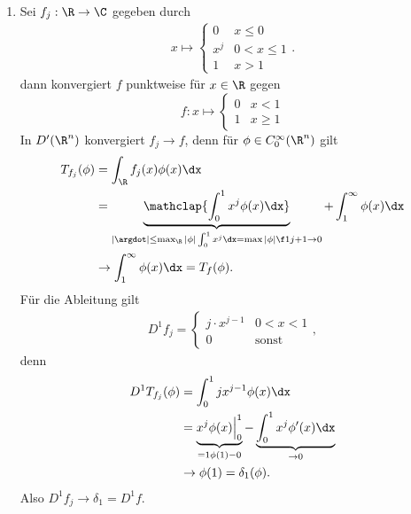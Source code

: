 \begin{ex} \label{5.17}
	\begin{enumerate}[1)]
		\item
			Sei $f_j: \R \to \C$ gegeben durch
			\begin{align*}
				x \mapsto \begin{cases}
					0 & x \le 0 \\
					x^j & 0 < x \le 1 \\
					1 & x > 1
				\end{cases}.
			\end{align*}
			dann konvergiert $f$ punktweise für $x \in \R$ gegen
			\[
				f: x \mapsto \begin{cases}
					0 & x < 1 \\
					1 & x \ge 1
				\end{cases}
			\]
			In $D'(\R^n)$ konvergiert $f_j \to f$, denn für $\phi \in C_0^\infty(\R^n)$ gilt
			\begin{align*}
				T_{f_j}(\phi) 
				&= \int_{\R} f_j(x) \phi(x) \dx \\
				&= \underbrace{\mathclap{\int_{0}^1 x^j \phi(x) \dx}}_{|\argdot| \le \max_{\R}|\phi| \int_0^1 x^j \dx = \max |\phi| \f 1{j+1} \to 0} + \int_{1}^\infty \phi(x) \dx \\
				&\to \int_{1}^\infty \phi(x) \dx
				= T_f(\phi).
			\end{align*}
			Für die Ableitung gilt
			\begin{align*}
				D^1  f_j = \begin{cases}
					j \cdot x^{j-1} & 0 < x < 1 \\
					0 & \text{sonst}
				\end{cases},
			\end{align*}
			denn
			\begin{align*}
				D^1 T_{f_j}(\phi)
				&= \int_{0}^1 j x^{j-1} \phi(x) \dx \\
				&= \underbrace{x^j \phi(x) \Big|_0^1}_{=1 \phi(1) - 0} - \underbrace{\int_{0}^1 x^j \phi'(x) \dx}_{\to 0} \\
				&\to \phi(1) = \delta_1(\phi).
			\end{align*}
			Also $D^1 f_j \to \delta_1 = D^1 f$.
	\end{enumerate}
\end{ex}
